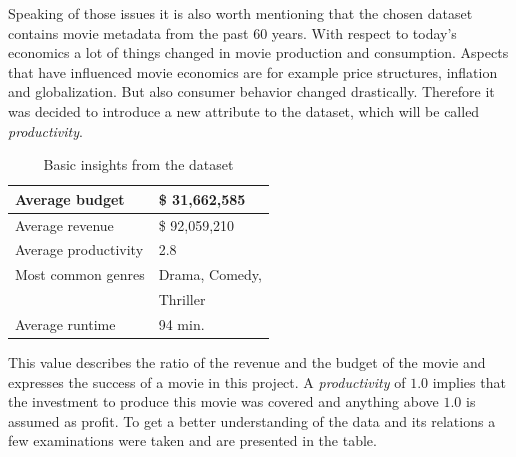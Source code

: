 Speaking of those issues it is also worth mentioning that the chosen dataset contains movie metadata from the past 60 years. With respect to today's economics a lot of things changed in movie production and consumption. Aspects that have influenced movie economics are for example price structures, inflation and globalization. But also consumer behavior changed drastically. Therefore it was decided to introduce a new attribute to the dataset, which will be called \textit{productivity}. 
\begin{table}
	\begin{tabular}{| l | l |}
	\hline
	Average budget & \$ 31,662,585 \\ \hline
	Average revenue & \$ 92,059,210 \\ \hline
	Average productivity & 2.8 \\ \hline
	Most common genres & Drama, Comedy,\\ & Thriller \\ \hline
	Average runtime & 94 min. \\ \hline
	\end{tabular}
	\caption{Basic insights from the dataset}
\end{table} 
This value describes the ratio of the revenue and the budget of the movie and expresses the success of a movie in this project. A \textit{productivity} of $1.0$ implies that the investment to produce this movie was covered and anything above $1.0$ is assumed as profit.
To get a better understanding of the data and its relations a few examinations were taken and are presented in the table.
